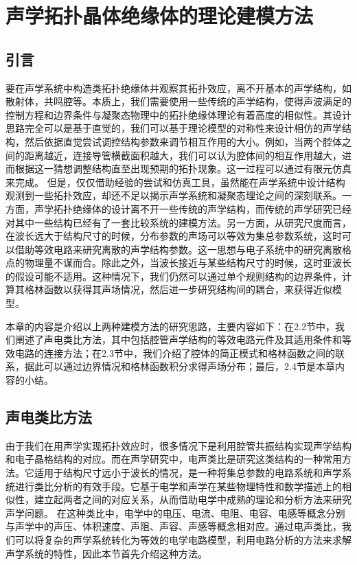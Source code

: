 \chapter{声学拓扑晶体绝缘体的理论建模方法}
\section{引言}

要在声学系统中构造类拓扑绝缘体并观察其拓扑效应，离不开基本的声学结构，如散射体，共鸣腔等。本质上，我们需要使用一些传统的声学结构，使得声波满足的控制方程和边界条件与凝聚态物理中的拓扑绝缘体理论有着高度的相似性。其设计思路完全可以是基于直觉的，我们可以基于理论模型的对称性来设计相仿的声学结构，然后依据直觉尝试调控结构参数来调节相互作用的大小。例如，当两个腔体之间的距离越近，连接导管横截面积越大，我们可以认为腔体间的相互作用越大，进而根据这一猜想调整结构直至出现预期的拓扑现象。这一过程可以通过有限元仿真来完成。
但是，仅仅借助经验的尝试和仿真工具，虽然能在声学系统中设计结构观测到一些拓扑效应，却还不足以揭示声学系统和凝聚态理论之间的深刻联系。一方面，声学拓扑绝缘体的设计离不开一些传统的声学结构，而传统的声学研究已经对其中一些结构已经有了一套比较系统的建模方法。另一方面，从研究尺度而言，在波长远大于结构尺寸的时候，分布参数的声场可以等效为集总参数系统，这时可以借助等效电路来研究离散的声学结构参数。这一思想与电子系统中的研究离散格点的物理量不谋而合。除此之外，当波长接近与某些结构尺寸的时候，这时亚波长的假设可能不适用。这种情况下，我们仍然可以通过单个规则结构的边界条件，计算其格林函数以获得其声场情况，然后进一步研究结构间的耦合，来获得近似模型。

本章的内容是介绍以上两种建模方法的研究思路，主要内容如下：在2.2节中，我们阐述了声电类比方法，其中包括腔管声学结构的等效电路元件及其适用条件和等效电路的连接方法；在2.3节中，我们介绍了腔体的简正模式和格林函数之间的联系，据此可以通过边界情况和格林函数积分求得声场分布；最后，2.4节是本章内容的小结。

\section{声电类比方法}

由于我们在用声学实现拓扑效应时，很多情况下是利用腔管共振结构实现声学结构和电子晶格结构的对应。而在声学研究中，电声类比是研究这类结构的一种常用方法。它适用于结构尺寸远小于波长的情况，是一种将集总参数的电路系统和声学系统进行类比分析的有效手段。它基于电学和声学在某些物理特性和数学描述上的相似性，建立起两者之间的对应关系，从而借助电学中成熟的理论和分析方法来研究声学问题。
在这种类比中，电学中的电压、电流、电阻、电容、电感等概念分别与声学中的声压、体积速度、声阻、声容、声感等概念相对应。通过电声类比，我们可以将复杂的声学系统转化为等效的电学电路模型，利用电路分析的方法来求解声学系统的特性，因此本节首先介绍这种方法。

